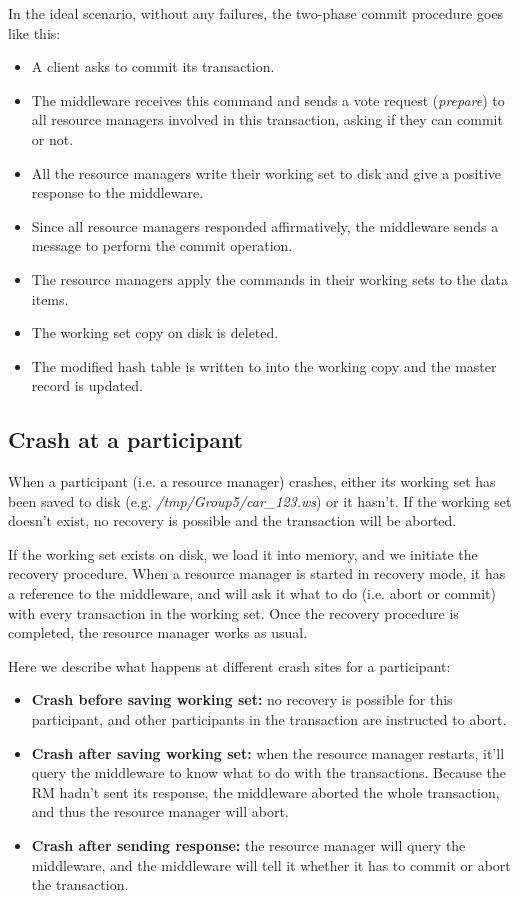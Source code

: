 \documentclass[11pt]{article}
\begin{document}
In the ideal scenario, without any failures, the two-phase commit
procedure goes like this:

\begin{itemize}
  \item A client asks to commit its transaction.
  \item The middleware receives this command and sends a vote request
    ({\it prepare}) to all resource managers involved in this
    transaction, asking if they can commit or not.
  \item All the resource managers write their working set to disk and
    give a positive response to the middleware.
  \item Since all resource managers responded affirmatively, the
    middleware sends a message to perform the commit operation.
  \item The resource managers apply the commands in their working sets
    to the data items.
  \item The working set copy on disk is deleted.
  \item The modified hash table is written to into the working copy
    and the master record is updated.
\end{itemize}

\subsection{Crash at a participant}

When a participant (i.e. a resource manager) crashes, either its
working set has been saved to disk (e.g. {\it /tmp/Group5/car\_123.ws})
or it hasn't.  If the working set doesn't exist, no recovery is
possible and the transaction will be aborted.

If the working set exists on disk, we load it into memory, and we
initiate the recovery procedure.  When a resource manager is started
in recovery mode, it has a reference to the middleware, and will ask
it what to do (i.e. abort or commit) with every transaction in the
working set.  Once the recovery procedure is completed, the resource
manager works as usual.

Here we describe what happens at different crash sites for a
participant:

\begin{itemize}
  \item {\bf Crash before saving working set:} no recovery is possible
    for this participant, and other participants in the transaction
    are instructed to abort.
  \item {\bf Crash after saving working set:} when the resource
    manager restarts, it'll query the middleware to know what to do
    with the transactions.  Because the RM hadn't sent its response,
    the middleware aborted the whole transaction, and thus the
    resource manager will abort.
  \item {\bf Crash after sending response:} the resource manager will
    query the middleware, and the middleware will tell it whether it
    has to commit or abort the transaction.
\end{itemize}
\end{document}

